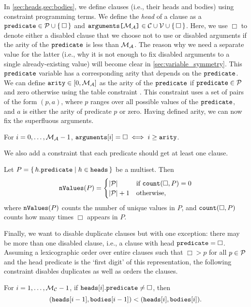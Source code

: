 In \cref{sec:heads,sec:bodies}, we define clauses (i.e., their heads and bodies)
using constraint programming terms. We define the \emph{head} of a clause as a
$\texttt{\textup{predicate}} \in \mathcal{P}{} \cup \{\, \Box \,\}$ and
$\texttt{\textup{{arguments}[}}{\mathcal{M}_{\mathcal{A}}{}}\texttt{\textup{]}} \in {\mathcal{C}{} \cup \mathcal{V}{}} \cup \{\, \Box \,\}$.
Here, we use $\Box$ to denote either a disabled clause that we choose not to use
or disabled arguments if the arity of the $\texttt{\textup{predicate}}$ is less than
$\mathcal{M}_{\mathcal{A}}{}$. The reason why we need a separate value for the latter (i.e., why
it is not enough to fix disabled arguments to a single already-existing value)
will become clear in \cref{sec:variable_symmetry}. This $\texttt{\textup{predicate}}$
variable has a corresponding arity that depends on the $\texttt{\textup{predicate}}$.
We can define $\texttt{\textup{arity}} \in [0, \mathcal{M}_{\mathcal{A}}{}]$ as the arity of the
$\texttt{\textup{predicate}}$ if $\texttt{\textup{predicate}} \in \mathcal{P}{}$ and zero
otherwise using the table constraint \citep{DBLP:conf/cpaior/MairyDL15}. This
constraint uses a set of pairs of the form $(p, a)$, where $p$ ranges over all
possible values of the $\texttt{\textup{predicate}}$, and $a$ is either the arity of
predicate $p$ or zero. Having defined arity, we can now fix the superfluous
arguments.
\begin{constraint}\label{constr:arity}
  For $i = 0, \dots, \mathcal{M}_{\mathcal{A}}{} - 1$, $\texttt{\textup{arguments}}[i] = \Box \iff i
  \ge \texttt{\textup{arity}}$.
\end{constraint}
We also add a constraint that each predicate should get at least one clause.
\begin{constraint}
  Let $P = \{\, h.\texttt{\textup{predicate}} \mid h \in \texttt{\textup{heads}} \,\}$ be a
  multiset. Then
  \[
    \texttt{\textup{nValues}}(P) = \begin{cases}
      |\mathcal{P}{}| & \text{if } \texttt{\textup{count}}(\Box, P) = 0 \\
      |\mathcal{P}{}| + 1 & \text{otherwise,}
    \end{cases}
  \]
  where $\texttt{\textup{nValues}}(P)$ counts the number of unique values in $P$, and
  $\texttt{\textup{count}}(\Box, P)$ counts how many times $\Box$ appears in $P$.
\end{constraint}
Finally, we want to disable duplicate clauses but with one exception: there may
be more than one disabled clause, i.e., a clause with head
$\texttt{\textup{predicate}} = \Box$. Assuming a lexicographic order over entire
clauses such that $\Box > p$ for all $p \in \mathcal{P}{}$ and the head
predicate is the `first digit' of this representation, the following constraint
disables duplicates as well as orders the clauses.
\begin{constraint}
  For $i = 1, \dots, \mathcal{M}_{\mathcal{C}}{} - 1$, if $\texttt{\textup{heads}}[i].\texttt{\textup{predicate}}
  \ne \Box$, then
  \[
    (\texttt{\textup{heads}}[i-1], \texttt{\textup{bodies}}[i-1]) < (\texttt{\textup{heads}}[i],
    \texttt{\textup{bodies}}[i]).
  \]
\end{constraint}


